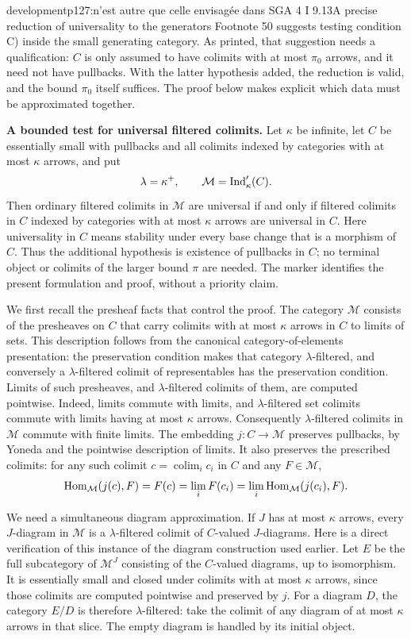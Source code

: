 \begin{dcomment}{development}{p127:n'est autre que celle envisagée dans SGA 4 I 9.13}{A precise reduction of universality to the generators}
Footnote 50 suggests testing condition C) inside the small generating category. As printed, that suggestion needs a qualification: $C$ is only assumed to have colimits with at most $\pi_0$ arrows, and it need not have pullbacks. With the latter hypothesis added, the reduction is valid, and the bound $\pi_0$ itself suffices. The proof below makes explicit which data must be approximated together.

\textbf{A bounded test for universal filtered colimits.}\ours{}
Let $\kappa$ be infinite, let $C$ be essentially small with pullbacks and all colimits indexed by categories with at most $\kappa$ arrows, and put
\[
 \lambda=\kappa^+,
 \qquad \mathcal M=\operatorname{Ind}'_{\kappa}(C).
\]
Then ordinary filtered colimits in $\mathcal M$ are universal if and only if filtered colimits in $C$ indexed by categories with at most $\kappa$ arrows are universal in $C$. Here universality in $C$ means stability under every base change that is a morphism of $C$. Thus the additional hypothesis is existence of pullbacks in $C$; no terminal object or colimits of the larger bound $\pi$ are needed. The marker identifies the present formulation and proof, without a priority claim.

We first recall the presheaf facts that control the proof. The category $\mathcal M$ consists of the presheaves on $C$ that carry colimits with at most $\kappa$ arrows in $C$ to limits of sets. This description follows from the canonical category-of-elements presentation: the preservation condition makes that category $\lambda$-filtered, and conversely a $\lambda$-filtered colimit of representables has the preservation condition. Limits of such presheaves, and $\lambda$-filtered colimits of them, are computed pointwise. Indeed, limits commute with limits, and $\lambda$-filtered set colimits commute with limits having at most $\kappa$ arrows. Consequently $\lambda$-filtered colimits in $\mathcal M$ commute with finite limits. The embedding $j:C\to\mathcal M$ preserves pullbacks, by Yoneda and the pointwise description of limits. It also preserves the prescribed colimits: for any such colimit $c=\operatorname{colim}_i c_i$ in $C$ and any $F\in\mathcal M$,
\[
 \mathrm{Hom}_{\mathcal M}(j(c),F)=F(c)
   =\lim_i F(c_i)
   =\lim_i\mathrm{Hom}_{\mathcal M}(j(c_i),F).
\]

We need a simultaneous diagram approximation. If $J$ has at most $\kappa$ arrows, every $J$-diagram in $\mathcal M$ is a $\lambda$-filtered colimit of $C$-valued $J$-diagrams. Here is a direct verification of this instance of the diagram construction used earlier. Let $E$ be the full subcategory of $\mathcal M^J$ consisting of the $C$-valued diagrams, up to isomorphism. It is essentially small and closed under colimits with at most $\kappa$ arrows, since those colimits are computed pointwise and preserved by $j$. For a diagram $D$, the category $E/D$ is therefore $\lambda$-filtered: take the colimit of any diagram of at most $\kappa$ arrows in that slice. The empty diagram is handled by its initial object.


\end{dcomment}
